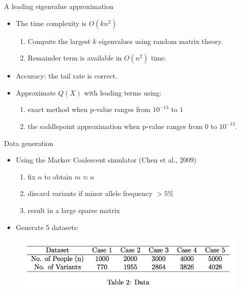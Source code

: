 \documentclass{beamer}
\begin{document}
\begin{frame}{A leading eigenvalue approximation}
\begin{center}
\begin{itemize}
  \item The time complexity is $O(kn^2)$
  \begin{enumerate}
    \item Compute the largest $k$ eigenvalues using random matrix theory.
    \item Remainder term is available in $O(n^2)$ time.
  \end{enumerate}
  \bigskip
  \item Accuracy: the tail rate is correct.
  \bigskip
  \item Approximate $Q(X)$ with leading terms using:
  \begin{enumerate}
  \item exact method when p-value ranges from $10^{-13}$ to $1$
  \item the saddlepoint approximation when p-value ranges from $0$ to $10^{-13}$.
  \end{enumerate}
\end{itemize}
\end{center}
\end{frame}


\begin{frame}{Data generation}
\begin{itemize}
\item Using the Markov Coalescent simulator (Chen et al., 2009) 
\begin{enumerate}
    \item fix $n$ to obtain $m \approx n$
    \item discard variants if minor allele frequency $>5\%$
    \item result in a large sparse matrix
\end{enumerate}
\bigskip
\item Generate 5 datasets:
\end{itemize}
\begin{figure}[H]	 
	\includegraphics[scale = 0.7]{plot2.png}
\end{figure} 
\end{frame}
\end{document}
